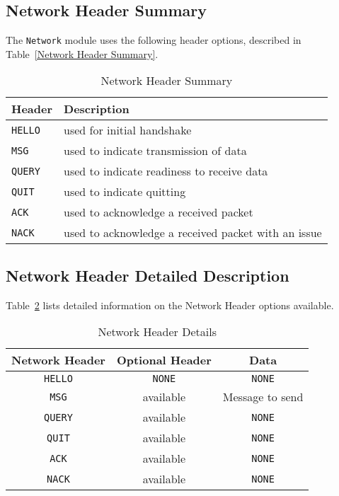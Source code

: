 \documentclass[sigconf]{acmart}
\begin{document}
\subsection{Network Header Summary}
The \texttt{Network} module uses the following header options, described in Table~\ref{Network
Header Summary}.
\begin{table}[htb]
	\centering
	\caption{Network Header Summary}
	\label{Network Header Summary}

	\begin{tabular}{|p{4em}|p{20em}|} \hline
		\textbf{Header} & \textbf{Description}                                \\ \hline
		\texttt{HELLO}  & used for initial handshake                          \\ \hline
		\texttt{MSG}    & used to indicate transmission of data               \\ \hline
		\texttt{QUERY}  & used to indicate readiness to receive data          \\ \hline
		\texttt{QUIT}   & used to indicate quitting                           \\ \hline
		\texttt{ACK}    & used to acknowledge a received packet               \\ \hline
		\texttt{NACK}   & used to acknowledge a received packet with an issue \\ \hline
	\end{tabular}
\end{table}

\subsection{Network Header Detailed Description}
Table~\ref{Network Header Details} lists detailed information on the Network Header options
available.
\begin{table}[htb]
	\centering
	\caption{Network Header Details}
	\label{Network Header Details}

	\begin{tabular}{|c|c|c|} \hline
		\textbf{Network Header} & \textbf{Optional Header} & \textbf{Data}   \\ \hline
		\texttt{HELLO}          & \texttt{NONE}            & \texttt{NONE}   \\ \hline
		\texttt{MSG}            & available                & Message to send \\ \hline
		\texttt{QUERY}          & available                & \texttt{NONE}   \\ \hline
		\texttt{QUIT}           & available                & \texttt{NONE}   \\ \hline
		\texttt{ACK}            & available                & \texttt{NONE}   \\ \hline
		\texttt{NACK}           & available                & \texttt{NONE}   \\ \hline
	\end{tabular}
\end{table}


\balance


\end{document}
